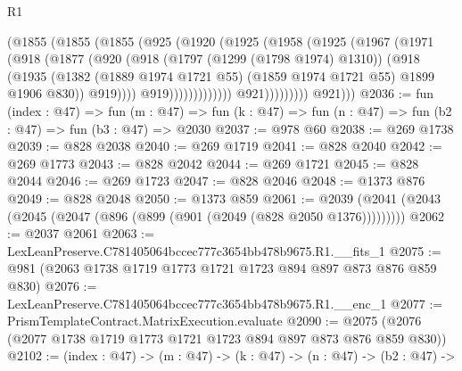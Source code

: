\begin{lexlean}{R1}
\begin{coremodule}
                                (@1855
                                  (@1855
                                    (@1855
                                      (@925
                                        (@1920
                                          (@1925
                                            (@1958
                                              (@1925
                                                (@1967
                                                  (@1971
                                                    (@918
                                                      (@1877
                                                        (@920
                                                          (@918
                                                            (@1797 (@1299 (@1798 @1974) @1310))
                                                            (@918
                                                              (@1935
                                                                (@1382
                                                                  (@1889 @1974 @1721 @55)
                                                                  (@1859 @1974 @1721 @55)
                                                                  @1899
                                                                  @1906
                                                                  @830))
                                                              @919))))
                                                      @919)))))))))))))
                            @921)))))))))
          @921)))
@2036 := fun (index : @47) =>
  fun (m : @47) => fun (k : @47) => fun (n : @47) => fun (b2 : @47) => fun (b3 : @47) => @2030
@2037 := @978 @60
@2038 := @269 @1738
@2039 := @828 @2038
@2040 := @269 @1719
@2041 := @828 @2040
@2042 := @269 @1773
@2043 := @828 @2042
@2044 := @269 @1721
@2045 := @828 @2044
@2046 := @269 @1723
@2047 := @828 @2046
@2048 := @1373 @876
@2049 := @828 @2048
@2050 := @1373 @859
@2061 := @2039 (@2041 (@2043 (@2045 (@2047 (@896 (@899 (@901 (@2049 (@828 @2050 @1376)))))))))
@2062 := @2037 @2061
@2063 := LexLeanPreserve.C781405064bccec777c3654bb478b9675.R1.__fits_1
@2075 := @981 (@2063 @1738 @1719 @1773 @1721 @1723 @894 @897 @873 @876 @859 @830)
@2076 := LexLeanPreserve.C781405064bccec777c3654bb478b9675.R1.__enc_1
@2077 := PrismTemplateContract.MatrixExecution.evaluate
@2090 := @2075 (@2076 (@2077 @1738 @1719 @1773 @1721 @1723 @894 @897 @873 @876 @859 @830))
@2102 := (index : @47) ->
  (m : @47) ->
  (k : @47) ->
  (n : @47) ->
  (b2 : @47) ->

\end{coremodule}
\end{lexlean}
